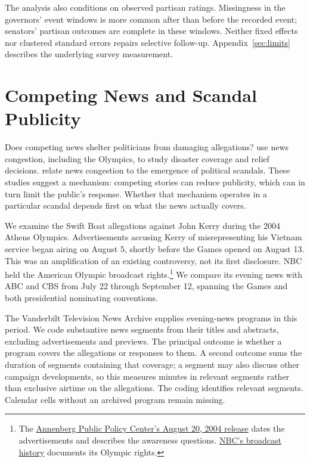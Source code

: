 \documentclass[11pt]{article}
\begin{document}
The analysis also conditions on observed partisan ratings. Missingness in the governors' event windows is more common after than before the recorded event; senators' partisan outcomes are complete in these windows. Neither fixed effects nor clustered standard errors repairs selective follow-up. Appendix~\ref{sec:limits} describes the underlying survey measurement.

\section{Competing News and Scandal Publicity}

Does competing news shelter politicians from damaging allegations? \citet{eisensee2007} use news congestion, including the Olympics, to study disaster coverage and relief decisions. \citet{nyhan2015,nyhan2017} relate news congestion to the emergence of political scandals. These studies suggest a mechanism: competing stories can reduce publicity, which can in turn limit the public's response. Whether that mechanism operates in a particular scandal depends first on what the news actually covers.

We examine the Swift Boat allegations against John Kerry during the 2004 Athens Olympics. Advertisements accusing Kerry of misrepresenting his Vietnam service began airing on August 5, shortly before the Games opened on August 13. This was an amplification of an existing controversy, not its first disclosure. NBC held the American Olympic broadcast rights.\footnote{The \href{https://www.annenbergpublicpolicycenter.org/cable-and-talk-radio-boost-public-awareness-of-swift-boat-ad/}{Annenberg Public Policy Center's August 20, 2004 release} dates the advertisements and describes the awareness questions. \href{https://www.nbcsports.com/pressbox/press-releases/nbcuniversals-olympic-tradition}{NBC's broadcast history} documents its Olympic rights.} We compare its evening news with ABC and CBS from July 22 through September 12, spanning the Games and both presidential nominating conventions.

The Vanderbilt Television News Archive supplies \PublicityPrograms{} evening-news programs in this period. We code substantive news segments from their titles and abstracts, excluding advertisements and previews. The principal outcome is whether a program covers the allegations or responses to them. A second outcome sums the duration of segments containing that coverage; a segment may also discuss other campaign developments, so this measures minutes in relevant segments rather than exclusive airtime on the allegations. The coding identifies \PublicitySegments{} relevant segments. Calendar cells without an archived program remain missing.
\end{document}
